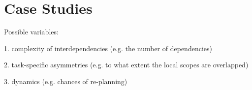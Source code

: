 \graphicspath{{Figures/}}

\chapter{Case Studies} %
\label{cha:case_studies}

Possible variables:

1. complexity of interdependencies (e.g. the number of dependencies)

2. task-specific asymmetries (e.g. to what extent the local scopes are overlapped)
 
3. dynamics (e.g. chances of re-planning)





 

